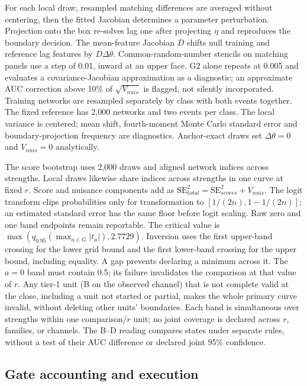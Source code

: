 For each local draw, resampled matching differences are averaged without centering, then the fitted Jacobian determines a parameter perturbation. Projection onto the box re-solves lag one after projecting $\eta$ and reproduces the boundary decision. The mean-feature Jacobian $D$ shifts null training and reference lag features by $D\Delta\theta$. Common-random-number stencils on matching panels use a step of 0.01, inward at an upper face. G2 alone repeats at 0.005 and evaluates a covariance-Jacobian approximation as a diagnostic; an approximate AUC correction above 10\% of $\sqrt{V_{nuis}}$ is flagged, not silently incorporated. Training networks are resampled separately by class with both events together. The fixed reference has 2,000 networks and two events per class. The local variance is centered; mean shift, fourth-moment Monte Carlo standard error and boundary-projection frequency are diagnostics. Anchor-exact draws set $\Delta\theta=0$ and $V_{nuis}=0$ analytically.

The score bootstrap uses 2,000 draws and aligned network indices across strengths. Local draws likewise share indices across strengths in one curve at fixed $r$. Score and nuisance components add as $\mathrm{SE}_{total}^2=\mathrm{SE}_{scores}^2+V_{nuis}$. The logit transform clips probabilities only for transformation to $[1/(2n),1-1/(2n)]$; an estimated standard error has the same floor before logit scaling. Raw zero and one band endpoints remain reportable. The critical value is $\max(q_{0.95}(\max_{a\in G}|t_a|),2.7729)$. Inversion uses the first upper-band crossing for the lower grid bound and the first lower-band crossing for the upper bound, including equality. A gap prevents declaring a minimum across it. The $a=0$ band must contain 0.5; its failure invalidates the comparison at that value of $r$. Any tier-1 unit (B on the observed channel) that is not complete valid at the close, including a unit not started or partial, makes the whole primary curve invalid, without deleting other units' boundaries.
Each band is simultaneous over strengths within one comparison/$r$ unit; no joint coverage is declared across $r$, families, or channels. The B--D reading compares states under separate rules, without a test of their AUC difference or declared joint 95\% confidence. %

\subsection*{Gate accounting and execution}\label{supp:gate-accounting}

